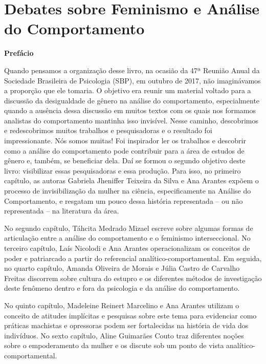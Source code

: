 \chapter*{Debates sobre Feminismo e Análise do Comportamento}
\begin{center}
    \textbf{\large Prefácio}
\end{center}

Quando pensamos a organização desse livro, na ocasião da 47ª Reunião Anual da Sociedade Brasileira de Psicologia (SBP), em outubro de 2017, não imaginávamos a proporção que ele tomaria. O objetivo era reunir um material voltado para a discussão da desigualdade de gênero na análise do comportamento, especialmente quando a ausência dessa discussão em muitos textos com os quais nos formamos analistas do comportamento mantinha isso invisível. Nesse caminho, descobrimos e redescobrimos muitos trabalhos e pesquisadoras e o resultado foi impressionante. Nós somos muitas! Foi inspirador ler os trabalhos e descobrir como a análise do comportamento pode contribuir para a área de estudos de gênero e, também, se beneficiar dela. Daí se formou o segundo objetivo deste livro: visibilizar essas pesquisadoras e essa produção. Para isso, no primeiro capítulo, as autoras Gabriela Jheniffer Teixeira da Silva e Ana Arantes expõem o processo de invisibilização da mulher na ciência, especificamente na Análise do Comportamento, e resgatam um pouco dessa história representada – ou não representada – na literatura da área.

No segundo capítulo, Táhcita Medrado Mizael escreve sobre algumas formas de articulação entre a análise do comportamento e o feminismo interseccional. No terceiro capítulo, Laís Nicolodi e Ana Arantes operacionalizam os conceitos de poder e patriarcado a partir do referencial analítico-comportamental. Em seguida, no quarto capítulo, Amanda Oliveira de Morais e Júlia Castro de Carvalho Freitas discorrem sobre cultura do estupro e os diferentes métodos de investigação deste fenômeno dentro e fora da psicologia e da análise do comportamento. 

No quinto capítulo, Madeleine Reinert Marcelino e Ana Arantes utilizam o conceito de atitudes implícitas e pesquisas sobre este tema para evidenciar como práticas machistas e opressoras podem ser fortalecidas na história de vida dos indivíduos. No sexto capítulo, Aline Guimarães Couto traz diferentes noções sobre o empoderamento da mulher e os discute sob um ponto de vista analítico-comportamental.

